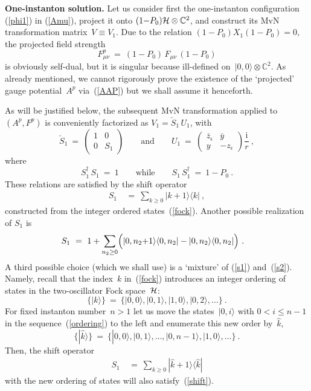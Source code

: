 \documentclass[a4paper,11pt]{article}
\numberwithin{equation}{section}
\def\eps{\epsilon}
\newcommand{\C}{\mathbb C}
\newcommand{\Hcal}{{\cal H}}
\def\i{\mbox{i}}
\def\>{\rangle}
\def\<{\langle}
\def\+{\dagger}
\begin{document}
{\noindent
{\bf One-instanton solution.}
Let us consider first the one-instanton
configuration (\ref{phi1}) in (\ref{Amu}), project it onto 
$(1{-}P_0)\Hcal\otimes\C^2$, and construct its
MvN transformation matrix~$V{\equiv}V_1$.
Due to the relation $(1{-}P_0)X_1(1{-}P_0)=0$, the projected field strength
\begin{equation}
F^p_{\mu\nu}\ =\ (1{-}P_0)\,F_{\mu\nu}\,(1{-}P_0)
\end{equation}
is obviously self-dual, but it is singular because ill-defined 
on~$|0,0\>\otimes\C^2$.  As already mentioned, 
we cannot rigorously prove the existence of the `projected' 
gauge potential~$A^p$ via~(\ref{AAP}) but we shall assume it henceforth.

As will be justified below,
the subsequent MvN transformation applied to $(A^p,F^p)$ is conveniently
factorized as $V_1=\check S_1\,U_1$, with
\begin{equation}
\check S_1\ =\ \begin{pmatrix}1&0\\0&S_1\end{pmatrix} 
\qquad\textrm{and}\qquad
U_1\ =\ \begin{pmatrix} \bar z_\eps & \bar y \\ y & -z_\eps \end{pmatrix}
\frac{\i}{r}\ ,
\end{equation}
where
\begin{equation} \label{shift}
S_1^\+\,S_1\ =\ 1 \qquad\textrm{while}\qquad
S_1\,S_1^\+\ =\ 1-P_0 \ .
\end{equation}
These relations are satisfied by the shift operator
\begin{align} \label{s1}
S_1\ &=\ \sum_{k\ge0} |k{+}1\>\<k| \ ,
\end{align}
constructed from the integer ordered states~(\ref{fock}).
Another possible realization of $S_1$ is~\cite{Furuuchi:2000vc}
\begin{align} \label{s2}
S_1\ &=\ 1 +\sum_{n_2\ge0} \Bigl( |0,n_2{+}1\>\<0,n_2|-|0,n_2\>\<0,n_2| \Bigr)
\ .
\end{align}
A third possible choice (which we shall use) is a `mixture' of (\ref{s1})
and~(\ref{s2}). Namely, recall that the index~$k$ in~(\ref{fock}) introduces 
an integer ordering of states in the two-oscillator Fock space~$\Hcal$:
\begin{equation} \label{ordering}
\bigl\{ |k\> \bigr\}\ =\ \bigl\{ |0,0\>,|0,1\>,|1,0\>,|0,2\>,\ldots\bigr\}\ .
\end{equation}
For fixed instanton number~$n{>}1$ let us move the states~$|0,i\>$ with
$0<i\le n{-}1$ in the sequence~(\ref{ordering}) to the left and enumerate
this new order by~$\hat{k}$,
\begin{equation} \label{neworder}
\bigl\{ |\hat{k}\> \bigr\}\ =\ 
\bigl\{ |0,0\>,|0,1\>,\ldots,|0,n{-}1\>,|1,0\>,\ldots\bigr\}\ .
\end{equation}
Then, the shift operator
\begin{align}\label{s3}
S_1\ &=\ \sum_{k\ge0} |\hat{k}{+}1\>\<\hat{k}|
\end{align}
with the new ordering of states will also satisfy~(\ref{shift}).

}
\end{document}
